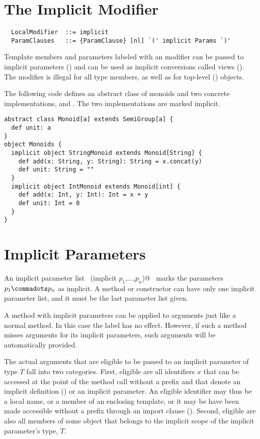 \section{The Implicit Modifier}\label{sec:impl-defs}

\syntax\begin{lstlisting}
  LocalModifier  ::= implicit
  ParamClauses   ::= {ParamClause} [nl] `(' implicit Params `)'
\end{lstlisting}

Template members and parameters labeled with an 
modifier can be passed to implicit parameters ()
and can be used as implicit conversions called views
(). The  modifier is illegal for all
type members, as well as for top-level ()
objects.

\example\label{ex:impl-monoid}
The following code defines an abstract class of monoids and
two concrete implementations,  and
. The two implementations are marked implicit.

\begin{lstlisting}
abstract class Monoid[a] extends SemiGroup[a] {
  def unit: a
}
object Monoids {
  implicit object StringMonoid extends Monoid[String] {
    def add(x: String, y: String): String = x.concat(y)
    def unit: String = ""
  }
  implicit object IntMonoid extends Monoid[int] {
    def add(x: Int, y: Int): Int = x + y
    def unit: Int = 0
  }
}
\end{lstlisting}

\section{Implicit Parameters}\label{sec:impl-params}

An implicit parameter list
~\lstinline@(implicit $p_1$,$\ldots$,$p_n$)@~ marks the parameters $p_1 \commadots p_n$ as
implicit. A method or constructor can have only one implicit parameter
list, and it must be the last parameter list given.

A method with implicit parameters can be applied to arguments just
like a normal method. In this case the  label has no
effect. However, if such a method misses arguments for its implicit
parameters, such arguments will be automatically provided.

The actual arguments that are eligible to be passed to an implicit
parameter of type $T$ fall into two categories. First, eligible are
all identifiers $x$ that can be accessed at the point of the method
call without a prefix and that denote an implicit definition
() or an implicit parameter.  An eligible
identifier may thus be a local name, or a member of an enclosing
template, or it may be have been made accessible without a prefix
through an import clause (). Second, eligible are
also all  members of some object that belongs to the
implicit scope of the implicit parameter's type, $T$.

